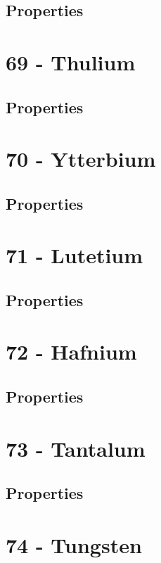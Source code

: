 \documentclass{book}
\begin{document}
\subsection{Properties}

\section{69 - Thulium}
\label{sec:elem-thulium}
\subsection{Properties}

\section{70 - Ytterbium}
\label{sec:elem-ytterbium}
\subsection{Properties}

\section{71 - Lutetium}
\label{sec:elem-lutetium}
\subsection{Properties}

\section{72 - Hafnium}
\label{sec:elem-hafnium}
\subsection{Properties}

\section{73 - Tantalum}
\label{sec:elem-tantalum}
\subsection{Properties}

\section{74 - Tungsten}
\label{sec:elem-tungsten}
\end{document}

